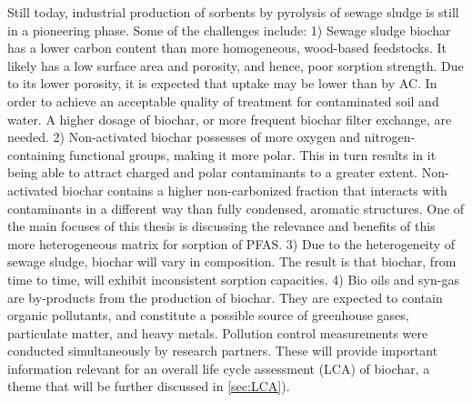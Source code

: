 Still today, industrial production of sorbents by pyrolysis of sewage sludge is still in a pioneering phase. Some of the challenges include: 1) Sewage sludge biochar has a lower carbon content than more homogeneous, wood-based feedstocks. It likely has a low surface area and porosity, and hence, poor sorption strength. Due to its lower porosity, it is expected that uptake may be lower than by AC. In order to achieve an acceptable quality of treatment for contaminated soil and water. A higher dosage of biochar, or more frequent biochar filter exchange, are needed. 2) Non-activated biochar possesses of more oxygen and nitrogen-containing functional groups, making it more polar. This in turn results in it being able to attract charged and polar contaminants to a greater extent. Non-activated biochar contains a higher non-carbonized fraction that interacts with contaminants in a different way than fully condensed, aromatic structures. One of the main focuses of this thesis is discussing the relevance and benefits of this more heterogeneous matrix for sorption of PFAS. 3) Due to the heterogeneity of sewage sludge, biochar will vary in composition. The result is that biochar, from time to time, will exhibit inconsistent sorption capacities. 4) Bio oils and syn-gas are by-products from the production of biochar. They are expected to contain organic pollutants, and constitute a possible source of greenhouse gases, particulate matter, and heavy metals. Pollution control measurements were conducted simultaneously by research partners. These will provide important information relevant for an overall life cycle assessment (LCA) of biochar, a theme that will be further discussed in \cref{sec:LCA}). 
